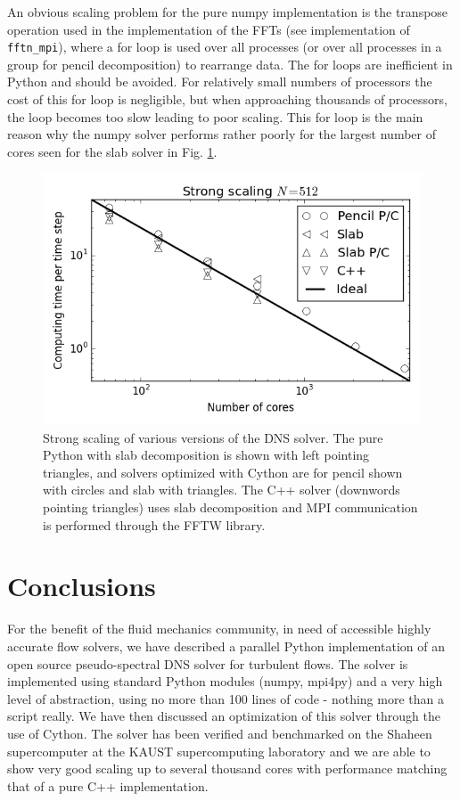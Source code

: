\documentclass[11pt, oneside]{article}
\newcommand{\inpyth}{\lstinline[style=pythonstyle, basicstyle=\ttfamily]} %[]%
\begin{document}
An obvious scaling problem for the pure numpy implementation is the transpose operation used in the implementation of the FFTs 
(see implementation of \inpyth{fftn_mpi}), where a for loop is used over all processes (or over all 
processes in a group for pencil decomposition) to rearrange data. The for loops are inefficient in Python 
and should be avoided. For relatively small numbers of processors the cost of this for loop is negligible, 
but when approaching thousands of processors, the loop becomes too slow leading to poor scaling. This for loop is the main reason why the numpy solver performs rather poorly for the largest number of cores seen for the slab solver in Fig. \ref{fig:strong_scaling_shaheen}. 


\begin{figure}
\includegraphics[scale=1]{figs/strong_scaling_shaheen_512.png}
\caption{Strong scaling of various versions of the DNS solver. The pure Python with slab decomposition is shown with left pointing triangles, and solvers optimized with Cython are for pencil shown with circles and slab with triangles. The C++ solver (downwords pointing triangles) uses slab decomposition and MPI communication is performed through the FFTW library. }
\label{fig:strong_scaling_shaheen}
\end{figure}

\section{Conclusions}

For the benefit of the fluid mechanics community, in need of accessible highly accurate flow solvers, we have described a parallel Python implementation of an open source pseudo-spectral DNS solver for turbulent flows. The solver is implemented using standard Python modules (numpy, mpi4py) and a very high level of abstraction, using no more than 100 lines of code - nothing more than a script really. We have then discussed an optimization of this solver through the use of Cython. The solver has been verified and benchmarked on the Shaheen supercomputer at the KAUST supercomputing laboratory and we are able to show very good scaling up to several thousand cores with performance matching that of a pure C++ implementation. 
\end{document}
